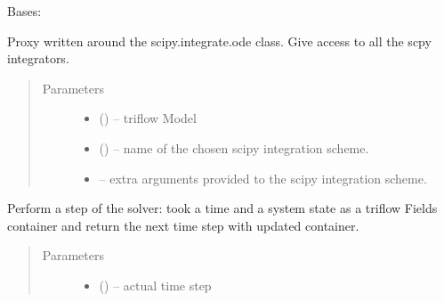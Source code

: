 \documentclass[letterpaper,10pt,english]{sphinxmanual}
\begin{document}
\begin{fulllineitems}
\label{\detokenize{triflow.plugins:triflow.plugins.schemes.scipy_ode}}
Bases: 

Proxy written around the scipy.integrate.ode class. Give access to all
the scpy integrators.
\begin{quote}\begin{description}
\item[{Parameters}] \leavevmode\begin{itemize}
\item {} 
 () -- triflow Model

\item {} 
 (\sphinxstyleliteralemphasis{, }\sphinxstyleliteralemphasis{, }) -- name of the chosen scipy integration scheme.

\item {} 
 -- extra arguments provided to the scipy integration scheme.

\end{itemize}

\end{description}\end{quote}

\begin{fulllineitems}
\label{\detokenize{triflow.plugins:triflow.plugins.schemes.scipy_ode.__call__}}
Perform a step of the solver: took a time and a system state as a
triflow Fields container and return the next time step with updated
container.
\begin{quote}\begin{description}
\item[{Parameters}] \leavevmode\begin{itemize}
\item {} 
 () -- actual time step


\end{itemize}
\end{description}
\end{quote}
\end{fulllineitems}
\end{fulllineitems}
\end{document}
